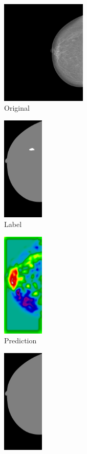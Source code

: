 \begin{figure}[h]
\begin{subfigure}{0.2\textwidth}
	\end{subfigure}%
	\\
	\begin{subfigure}{0.25\textwidth}
		\centering
			\includegraphics[height = 5cm]{plots/mammogram_ex2.png}
		\caption{Original}
	\end{subfigure}
	\begin{subfigure}{0.2\textwidth}
		\centering
			\includegraphics[height = 5cm]{plots/label_ex2.png}
		\caption{Label}
	\end{subfigure}
	\begin{subfigure}{0.16\textwidth}
		\centering
			\includegraphics[height = 5cm]{plots/logits_ex2_v2.png}
		\caption{Prediction}
	\end{subfigure}
	\begin{subfigure}{0.2\textwidth}
		\centering
			\includegraphics[height = 5cm]{plots/segmentation_ex2_v2.png}

\end{subfigure}
\end{figure}
